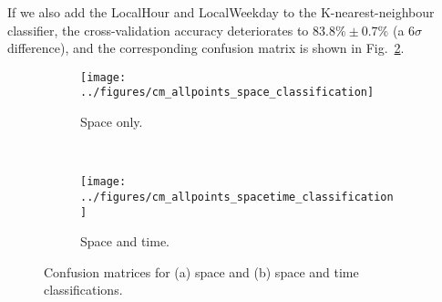 If we also add the LocalHour and LocalWeekday to the K-nearest-neighbour classifier, the cross-validation accuracy deteriorates to $83.8\% \pm 0.7\%$ (a $6\sigma$ difference), and the corresponding confusion matrix is shown in Fig.~\ref{space_and_time}.

\begin{figure}
\centering
\begin{subfigure}[t]{0.65\textwidth}
	\centering
	\texttt{[image: ../figures/cm\_allpoints\_space\_classification]}
	\caption{Space only.} 
	\label{space_only}
\end{subfigure}
~
\begin{subfigure}[t]{0.65\textwidth}
	\centering
	\texttt{[image: ../figures/cm\_allpoints\_spacetime\_classification]}
	\caption{Space and time.}
	\label{space_and_time}
\end{subfigure}
\caption{Confusion matrices for (a) space and (b) space and time classifications.}
\label{fg:space_and_spacetime}
\end{figure}